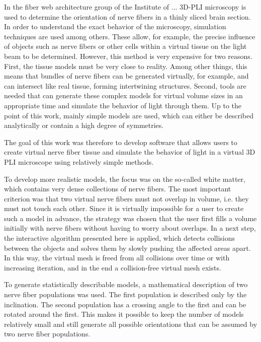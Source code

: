%
% 
In the fiber web architecture group of the Institute of ... 3D-PLI microscopy is used to determine the orientation of nerve fibers in a thinly sliced brain section.
In order to understand the exact behavior of the microscopy, simulation techniques are used among others.
These allow, for example, the precise influence of objects such as nerve fibers or other cells within a virtual tissue on the light beam to be determined.
However, this method is very expensive for two reasons.
First, the tissue models must be very close to reality.
Among other things, this means that bundles of nerve fibers can be generated virtually, for example, and can intersect like real tissue, forming intertwining structures.
Second, tools are needed that can generate these complex models for virtual volume sizes in an appropriate time and simulate the behavior of light through them.
Up to the point of this work, mainly simple models are used, which can either be described analytically or contain a high degree of symmetries.

The goal of this work was therefore to develop software that allows users to create virtual nerve fiber tissue and simulate the behavior of light in a virtual 3D PLI microscope using relatively simple methods.

To develop more realistic models, the focus was on the so-called white matter, which contains very dense collections of nerve fibers.
The most important criterion was that two virtual nerve fibers must not overlap in volume, i.e. they must not touch each other.
Since it is virtually impossible for a user to create such a model in advance, the strategy was chosen that the user first fills a volume initially with nerve fibers without having to worry about overlaps.
In a next step, the interactive algorithm presented here is applied, which detects collisions between the objects and solves them by slowly pushing the affected areas apart.
In this way, the virtual mesh is freed from all collisions over time or with increasing iteration, and in the end a collision-free virtual mesh exists.

To generate statistically describable models, a mathematical description of two nerve fiber populations was used.
The first population is described only by the inclination.
The second population has a crossing angle to the first and can be rotated around the first.
This makes it possible to keep the number of models relatively small and still generate all possible orientations that can be assumed by two nerve fiber populations.

